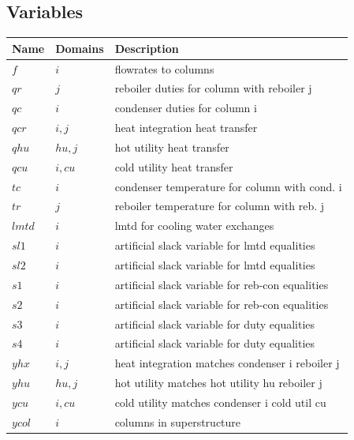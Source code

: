 \documentclass[11pt]{article}
\begin{document}
\subsection*{Variables}
\begin{tabularx}{\textwidth}{| l | l | X |}
\hline
\textbf{Name} & \textbf{Domains} & \textbf{Description}\\
\hline
\endhead

$f$ & $i$ & flowrates to columns\\
$qr$ & $j$ & reboiler duties for column with reboiler j\\
$qc$ & $i$ & condenser duties for column i\\
$qcr$ & $i,j$ & heat integration heat transfer\\
$qhu$ & $hu,j$ & hot utility heat transfer\\
$qcu$ & $i,cu$ & cold utility heat transfer\\
$tc$ & $i$ & condenser temperature for column with cond. i\\
$tr$ & $j$ & reboiler temperature for column with reb. j\\
$lmtd$ & $i$ & lmtd for cooling water exchanges\\
$sl1$ & $i$ & artificial slack variable for lmtd equalities\\
$sl2$ & $i$ & artificial slack variable for lmtd equalities\\
$s1$ & $i$ & artificial slack variable for reb-con equalities\\
$s2$ & $i$ & artificial slack variable for reb-con equalities\\
$s3$ & $i$ & artificial slack variable for duty equalities\\
$s4$ & $i$ & artificial slack variable for duty equalities\\
$yhx$ & $i,j$ & heat integration matches condenser i reboiler j\\
$yhu$ & $hu,j$ & hot utility matches hot utility hu reboiler j\\
$ycu$ & $i,cu$ & cold utility matches condenser i cold util cu\\
$ycol$ & $i$ & columns in superstructure\\
\hline
\end{tabularx}
\end{document}
